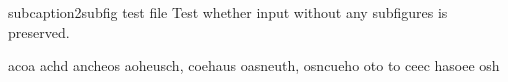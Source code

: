 subcaption2subfig test file
Test whether input without any subfigures is preserved.

acoa achd ancheos
aoheusch, coehaus
oasneuth, osncueho oto to ceec hasoee osh
